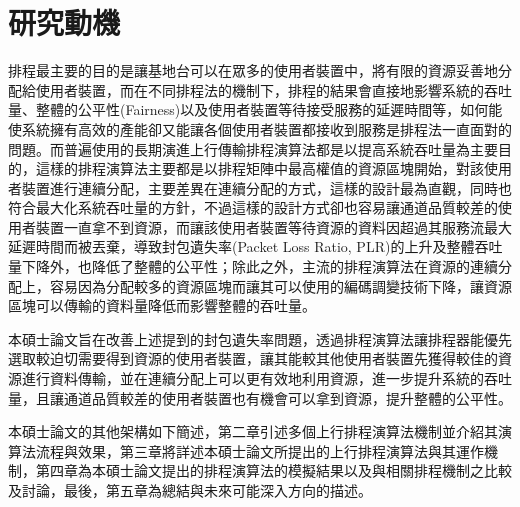 \section{研究動機}
排程最主要的目的是讓基地台可以在眾多的使用者裝置中，將有限的資源妥善地分配給使用者裝置，而在不同排程法的機制下，排程的結果會直接地影響系統的吞吐量、整體的公平性(Fairness)以及使用者裝置等待接受服務的延遲時間等，如何能使系統擁有高效的產能卻又能讓各個使用者裝置都接收到服務是排程法一直面對的問題。而普遍使用的長期演進上行傳輸排程演算法都是以提高系統吞吐量為主要目的，這樣的排程演算法主要都是以排程矩陣中最高權值的資源區塊開始，對該使用者裝置進行連續分配，主要差異在連續分配的方式，這樣的設計最為直觀，同時也符合最大化系統吞吐量的方針，不過這樣的設計方式卻也容易讓通道品質較差的使用者裝置一直拿不到資源，而讓該使用者裝置等待資源的資料因超過其服務流最大延遲時間而被丟棄，導致封包遺失率(Packet Loss Ratio, PLR)的上升及整體吞吐量下降外，也降低了整體的公平性；除此之外，主流的排程演算法在資源的連續分配上，容易因為分配較多的資源區塊而讓其可以使用的編碼調變技術下降，讓資源區塊可以傳輸的資料量降低而影響整體的吞吐量。

本碩士論文旨在改善上述提到的封包遺失率問題，透過排程演算法讓排程器能優先選取較迫切需要得到資源的使用者裝置，讓其能較其他使用者裝置先獲得較佳的資源進行資料傳輸，並在連續分配上可以更有效地利用資源，進一步提升系統的吞吐量，且讓通道品質較差的使用者裝置也有機會可以拿到資源，提升整體的公平性。

本碩士論文的其他架構如下簡述，第二章引述多個上行排程演算法機制並介紹其演算法流程與效果，第三章將詳述本碩士論文所提出的上行排程演算法與其運作機制，第四章為本碩士論文提出的排程演算法的模擬結果以及與相關排程機制之比較及討論，最後，第五章為總結與未來可能深入方向的描述。

